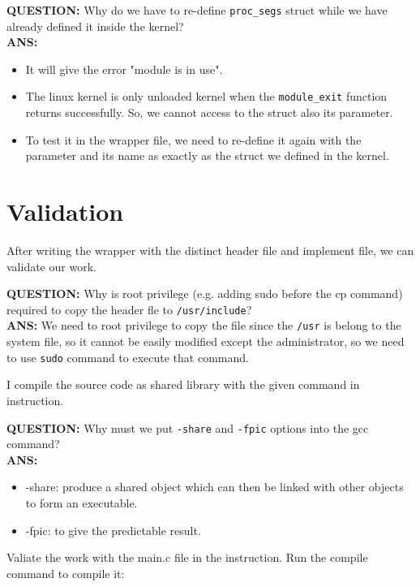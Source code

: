 \documentclass[a4paper, 11pt]{article}
\begin{document}
\textbf{QUESTION:}  Why do we have to re-define \texttt{proc\_segs} struct while we have already defined it inside the kernel? \\
\textbf{ANS:} 
\begin{itemize}
    \item It will give the error "module is in use".
    \item The linux kernel is only unloaded kernel when the \texttt{module\_exit} function returns successfully. So, we cannot access to the struct also its parameter.
    \item To test it in the wrapper file, we need to re-define it again with the parameter and its name as exactly as the struct we defined in the kernel.
\end{itemize}

\section{Validation}

\par{After writing the wrapper with the distinct header file and implement file, we can validate our work.}

\textbf{QUESTION:} Why is root privilege (e.g. adding sudo before the cp command) required to copy the header fle to \texttt{/usr/include}? \\
\textbf{ANS:} We need to root privilege to copy the  file since the \texttt{/usr} is belong to the system file, so it cannot be easily modified except the administrator, so we need to use \texttt{sudo} command to execute that command.

\par{I compile the source code as shared library with the given command in instruction.}

\textbf{QUESTION:} Why must we put \texttt{-share} and \texttt{-fpic} options into the gcc command? \\
\textbf{ANS:}
\begin{itemize}
    \item -share: produce a shared object which can then be linked with other objects to form an executable.
    \item -fpic: to give the predictable result.
\end{itemize}

\par{Valiate the work with the main.c file in the instruction. Run the compile command to compile it:}
\end{document}
